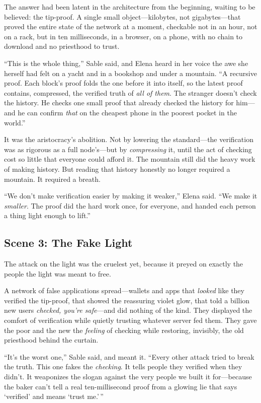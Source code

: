 The answer had been latent in the architecture from the beginning, waiting to be
believed: the tip-proof. A single small object---kilobytes, not gigabytes---that
proved the entire state of the network at a moment, checkable not in an hour, not on
a rack, but in ten milliseconds, in a browser, on a phone, with no chain to download
and no priesthood to trust.

``This is the whole thing,'' Sable said, and Elena heard in her voice the awe she
herself had felt on a yacht and in a bookshop and under a mountain. ``A recursive
proof. Each block's proof folds the one before it into itself, so the latest proof
contains, compressed, the verified truth of \emph{all of them}. The stranger doesn't
check the history. He checks one small proof that already checked the history for
him---and he can confirm \emph{that} on the cheapest phone in the poorest pocket in
the world.''

It was the aristocracy's abolition. Not by lowering the standard---the verification
was as rigorous as a full node's---but by \emph{compressing} it, until the act of
checking cost so little that everyone could afford it. The mountain still did the
heavy work of making history. But reading that history honestly no longer required a
mountain. It required a breath.

``We don't make verification easier by making it weaker,'' Elena said. ``We make it
\emph{smaller}. The proof did the hard work once, for everyone, and handed each
person a thing light enough to lift.''

\hypertarget{scene-3-the-fake-light}{%
\subsection{Scene 3: The Fake
Light}\label{scene-3-the-fake-light}}

The attack on the light was the cruelest yet, because it preyed on exactly the people
the light was meant to free.

A network of false applications spread---wallets and apps that \emph{looked} like
they verified the tip-proof, that showed the reassuring violet glow, that told a
billion new users \emph{checked, you're safe}---and did nothing of the kind. They
displayed the comfort of verification while quietly trusting whatever server fed
them. They gave the poor and the new the \emph{feeling} of checking while restoring,
invisibly, the old priesthood behind the curtain.

``It's the worst one,'' Sable said, and meant it. ``Every other attack tried to break
the truth. This one fakes the \emph{checking}. It tells people they verified when they
didn't. It weaponizes the slogan against the very people we built it for---because the
baker can't tell a real ten-millisecond proof from a glowing lie that says `verified'
and means `trust me.'\,''

